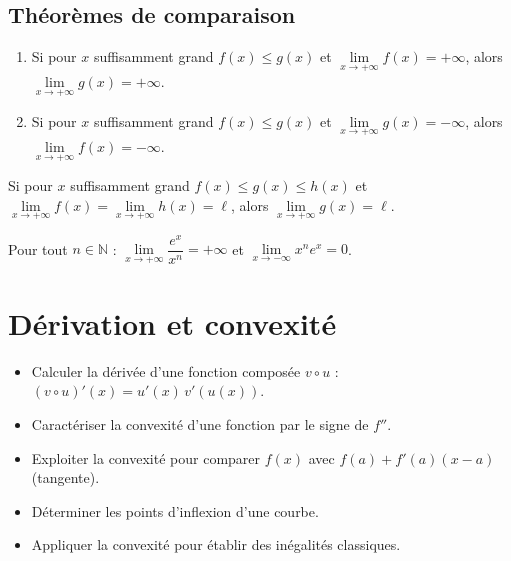 \documentclass[11pt,a4paper,openany]{book}
\theoremstyle{definition}
\newcommand{\nchap}{
    \setcounter{Définition}{0}
    \setcounter{Propriété}{0}
    \setcounter{Théorème}{0}
    \setcounter{Remarque}{0}
    \setcounter{Exemple}{0}
}
\begin{document}
    \section{Théorèmes de comparaison}
    \begin{Théorème}
        \begin{enumerate}
            \item Si pour $x$ suffisamment grand $f(x)\leq g(x)$ et
                  $\lim\limits_{x\to+\infty}f(x)=+\infty$, alors
                  $\lim\limits_{x\to+\infty}g(x)=+\infty$.
            \item Si pour $x$ suffisamment grand $f(x)\leq g(x)$ et
                  $\lim\limits_{x\to+\infty}g(x)=-\infty$, alors
                  $\lim\limits_{x\to+\infty}f(x)=-\infty$.
        \end{enumerate}
    \end{Théorème}

    \begin{Théorème}
        Si pour $x$ suffisamment grand $f(x)\leq g(x)\leq h(x)$ et
        $\lim\limits_{x\to+\infty}f(x)=\lim\limits_{x\to+\infty}h(x)=\ell$, alors
        $\lim\limits_{x\to+\infty}g(x)=\ell$.
    \end{Théorème}

    \begin{Théorème}
        Pour tout $n\in\mathbb{N}$ :
        $\lim\limits_{x\to+\infty}\dfrac{e^x}{x^n}=+\infty$ et
        $\lim\limits_{x\to-\infty}x^n e^x=0$.
    \end{Théorème}

    \chapter{Dérivation et convexité}
    \nchap

    \begin{capacitesbox}
    \begin{itemize}
        \item Calculer la dérivée d'une fonction composée $v\circ u$ : $(v\circ u)'(x)=u'(x)\,v'(u(x))$.
        \item Caractériser la convexité d'une fonction par le signe de $f''$.
        \item Exploiter la convexité pour comparer $f(x)$ avec $f(a)+f'(a)(x-a)$ (tangente).
        \item Déterminer les points d'inflexion d'une courbe.
        \item Appliquer la convexité pour établir des inégalités classiques.
    \end{itemize}
    \end{capacitesbox}
\end{document}
